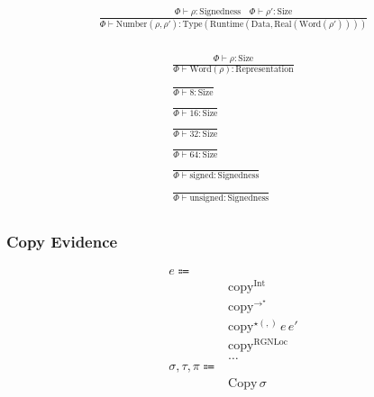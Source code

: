 \documentclass {article}
\begin{document}
\begin{gather*}
\frac
{\Phi \vdash \rho : \text{Signedness} \quad \Phi \vdash \rho' : \text{Size}}
{\Phi \vdash \text{Number} (\rho, \rho') : \text{Type} (\text{Runtime} (\text{Data}, \text{Real} (\text{Word} (\rho')))) } \\
\end{gather*}

\begin{gather*}
\frac
{\Phi \vdash \rho : \text{Size}}
{\Phi \vdash \text{Word} (\rho) : \text{Representation}} \\
\\
\frac
{}
{\Phi \vdash 8 : \text{Size}} \\
\\
\frac
{}
{\Phi \vdash 16 : \text{Size}} \\
\\
\frac
{}
{\Phi \vdash 32 : \text{Size}} \\
\\
\frac
{}
{\Phi \vdash 64 : \text{Size}} \\
\\
\frac
{}
{\Phi \vdash \text{signed} : \text{Signedness}} \\
\\
\frac
{}
{\Phi \vdash \text{unsigned} : \text{Signedness}} \\
\end{gather*}


\subsubsection{Copy Evidence}
\begin{align*}
e \Coloneqq & \\
& \text{copy}^\text{Int} \tag{Copy Integer Proof} \\
& \text{copy}^{\to^\star} \tag{Copy Function Pointer Proof} \\
& \text{copy}^{\star(,)} \, e \, e' \tag{Copy Tuple Proof} \\
& \text{copy}^{\text{RGNLoc}} \tag{Copy Reference Proof}\\
& \dots \\
\sigma, \tau, \pi \Coloneqq & \\
& \text{Copy} \, \sigma \tag{Runtime Copyable} \\
\end{align*}
\end{document}
